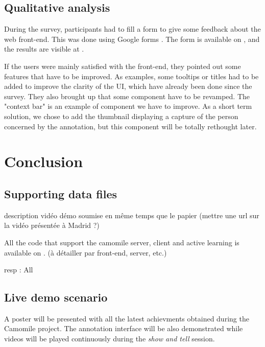 \documentclass[a4paper]{article}
\begin{document}
 
    

  
     \subsection{Qualitative analysis}
    

During the survey, participants had to fill a form to give some  feedback about the web front-end. This was done using Google forms \cite{url-google-forms}. The form is available on \cite{url-list-form}, and the results are visible at \cite{url-list-form-results}.

If the users were mainly satisfied with the front-end, they pointed out some features that have to be improved. As examples, some tooltips or titles had to be added to improve the clarity of the UI, which have already been done since the survey. They also brought up that some component have to be revamped. The "context bar" is an example of component we have to improve. As a short term solution, we chose to add the thumbnail displaying a capture of the person concerned by the annotation, but this component will be totally rethought later.




  \section{Conclusion}
  
    \subsection{Supporting data files}

description vidéo démo soumise en même temps que le papier
(mettre une url sur la vidéo présentée à Madrid ?)

All the code that support the camomile server, client and active learning is available on \cite{urlcamomile}.
(à détailler par front-end, server, etc.)

resp : All

    \subsection{Live demo scenario}

A poster will be presented with all the latest achievments obtained during the Camomile project. The annotation interface will be also demonstrated while videos will be played continuously during the \textit{show and tell} session. %
\end{document}
